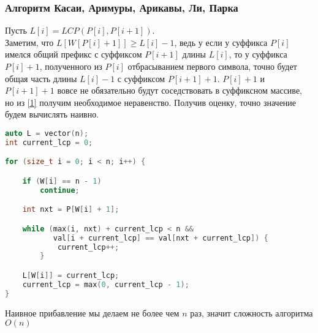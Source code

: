 \subsubsection{Алгоритм Касаи, Аримуры, Арикавы, Ли, Парка}
Пусть $L[i] = LCP(P[i], P[i + 1])$. \\
Заметим, что  $L[W[P[i] + 1]] \geq L[i] - 1$, ведь у если у суффикса $P[i]$ имелся общий префикс с суффиксом  $P[i + 1]$ длины  $L[i]$, то у суффикса  $P[i] + 1$, полученного из  $P[i]$ отбрасыванием первого символа, точно будет общая часть длины  $L[i] - 1$ с суффиксом  $P[i + 1] + 1$.  $P[i] + 1$ и  $P[i + 1] + 1$ вовсе не обязательно будут соседствовать в суффиксном массиве, но из \ref{1} получим необходимое неравенство. Получив оценку, точно значение будем вычислять наивно.
\begin{lstlisting}[language = C++]
auto L = vector(n);
int current_lcp = 0;

for (size_t i = 0; i < n; i++) {

    if (W[i] == n - 1)
        continue;

    int nxt = P[W[i] + 1];

    while (max(i, nxt) + current_lcp < n && 
           val[i + current_lcp] == val[nxt + current_lcp]) {
            current_lcp++;
        }

    L[W[i]] = current_lcp;
    current_lcp = max(0, current_lcp - 1);
}
\end{lstlisting}

Наивное прибавление мы делаем не более чем $n$ раз, значит сложность алгоритма  $O(n)$

